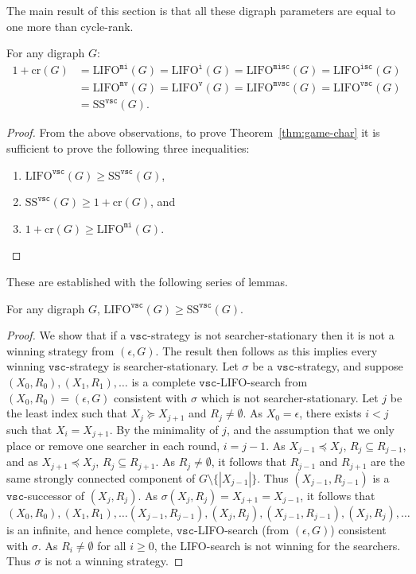 \documentclass{llncs}
\newcommand{\letters}[1]{\{\!|#1|\!\}}
\newcommand{\cycr}[1]{\textrm{cr}(#1)}
\newcommand{\lifo}[1]{\textrm{LIFO}^{#1}}
\newcommand{\sstat}[1]{\textrm{SS}^{#1}}
\newcommand{\ivar}{\texttt{i}}
\newcommand{\vvar}{\texttt{v}}
\newcommand{\iscvar}{\texttt{isc}}
\newcommand{\vscvar}{\texttt{vsc}}
\newcommand{\mvar}{\texttt{m}}
\begin{document}
The main result of this section is that all these digraph parameters are equal to one more than cycle-rank.
\begin{theorem}\label{thm:game-char}
For any digraph $G$:
\[\begin{array}{rl}
	 1+ \cycr{G} &= \lifo{\mvar\ivar}(G) = \lifo{\ivar}(G) = \lifo{\mvar\iscvar}(G) = \lifo{\iscvar}(G) \\
	&= \lifo{\mvar\vvar}(G) = \lifo{\vvar}(G) = \lifo{\mvar\vscvar}(G) = \lifo{\vscvar}(G)\\
	&=\sstat{\vscvar}(G).
\end{array}\]
\end{theorem}
\begin{proof}
From the above observations, to prove Theorem~\ref{thm:game-char} it is sufficient to prove the following three inequalities:
\begin{enumerate}[(1) ]
\item $\lifo{\vscvar}(G) \geq \sstat{\vscvar}(G)$,
\item $\sstat{\vscvar}(G) \geq 1 + \cycr{G}$, and
\item $1 + \cycr{G} \geq \lifo{\mvar\ivar}(G)$.
\end{enumerate}
\end{proof}
These are established with the following series of lemmas.
\begin{lemma}  
For any digraph $G$, $\lifo{\vscvar}(G) \geq \sstat{\vscvar}(G)$.
\end{lemma}
\begin{proof}
We show that if a $\vscvar$-strategy is not searcher-stationary then it is not a winning strategy from $(\epsilon, G)$.  The result then follows as this implies every winning $\vscvar$-strategy is searcher-stationary.
Let $\sigma$ be a $\vscvar$-strategy, and suppose $(X_0, R_0), (X_1, R_1), \ldots$ is a complete $\vscvar$-LIFO-search from $(X_0,R_0) = (\epsilon, G)$ consistent with $\sigma$ which is not searcher-stationary.  
Let $j$ be the least index such that $X_{j} \succeq X_{j+1}$ and $R_{j} \neq \emptyset$.  As $X_0 = \epsilon$, there exists $i < j$ such that $X_i = X_{j+1}$.  By the minimality of $j$, and the assumption that we only place or remove one searcher in each round, $i = j-1$.   As $X_{j-1} \preceq X_{j}$, $R_{j} \subseteq R_{j-1}$, and as $X_{j+1} \preceq X_{j}$, $R_{j} \subseteq R_{j+1}$.  As $R_{j} \neq \emptyset$, it follows that $R_{j-1}$ and $R_{j+1}$ are the same strongly connected component of $G \setminus \letters{X_{j-1}}$.  Thus $(X_{j-1},R_{j-1})$ is a $\vscvar$-successor of $(X_{j},R_{j})$.  As $\sigma(X_j,R_j) = X_{j+1} = X_{j-1}$, it follows that $(X_0, R_0), (X_1, R_1), \ldots (X_{j-1},R_{j-1}),(X_{j},R_{j}),(X_{j-1},R_{j-1}),(X_{j},R_{j}), \ldots$ is an infinite, and hence complete,  $\vscvar$-LIFO-search (from $(\epsilon, G)$) consistent with $\sigma$.  As $R_i \neq \emptyset$ for all $i \geq 0$, the LIFO-search is not winning for the searchers.  Thus $\sigma$ is not a winning strategy.
\end{proof}
\end{document}
